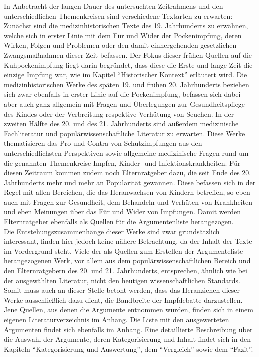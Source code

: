 \documentclass[
    a4paper,
    12pt,
    hyphens,
    chapterprefix=true,
    headheight=33pt,
    footheight=29pt,
    headings=optiontohead, %
]{scrartcl}
\begin{document}
In Anbetracht der langen Dauer des untersuchten Zeitrahmens und den unterschiedlichen Themenkreisen sind verschiedene Textarten zu erwarten: Zunächst sind die medizinhistorischen Texte des 19. Jahrhunderts zu erwähnen, welche sich in erster Linie mit dem Für und Wider der Pockenimpfung, deren Wirken, Folgen und Problemen oder den damit einhergehenden gesetzlichen Zwangsmaßnahmen dieser Zeit befassen. Der Fokus dieser frühen Quellen auf die Kuhpockenimpfung liegt darin begründet, dass diese die Erste und lange Zeit die einzige Impfung war, wie im Kapitel "`Historischer Kontext"' erläutert wird. Die medizinhistorischen Werke des späten 19. und frühen 20. Jahrhunderts beziehen sich zwar ebenfalls in erster Linie auf die Pockenimpfung, befassen sich dabei aber auch ganz allgemein mit Fragen und Überlegungen zur Gesundheitspflege des Kindes oder der Verbreitung respektive Verhütung von Seuchen. In der zweiten Hälfte des 20. und des 21. Jahrhunderts sind außerdem medizinische Fachliteratur und populärwissenschaftliche Literatur zu erwarten. Diese Werke thematisieren das Pro und Contra von Schutzimpfungen aus den unterschiedlichsten Perspektiven sowie allgemeine medizinische Fragen rund um die genannten Themenkreise Impfen, Kinder- und Infektionskrankheiten. Für diesen Zeitraum kommen zudem noch Elternratgeber dazu, die seit Ende des 20. Jahrhunderts mehr und mehr an Popularität gewannen. Diese befassen sich in der Regel mit allen Bereichen, die das Heranwachsen von Kindern betreffen, so eben auch mit Fragen zur Gesundheit, dem Behandeln und Verhüten von Krankheiten und eben Meinungen über das Für und Wider von Impfungen. Damit werden Elternratgeber ebenfalls als Quellen für die Argumentenliste herangezogen.\\
Die Entstehungszusammenhänge dieser Werke sind zwar grundsätzlich interessant, finden hier jedoch keine nähere Betrachtung, da der Inhalt der Texte im Vordergrund steht. Viele der als Quellen zum Erstellen der Argumenteliste herangezogenen Werk, vor allem aus dem populärwissenschaftlichen Bereich und den Elternratgebern des 20. und 21. Jahrhunderts, entsprechen, ähnlich wie bei der ausgewählten Literatur, nicht den heutigen wissenschaftlichen Standards. Somit muss auch an dieser Stelle betont werden, dass das Heranziehen dieser Werke ausschließlich dazu dient, die Bandbreite der Impfdebatte darzustellen.\\
Jene Quellen, aus denen die Argumente entnommen wurden, finden sich in einem eigenen Literaturverzeichnis im Anhang. Die Liste mit den ausgewerteten Argumenten findet sich ebenfalls im Anhang. Eine detaillierte Beschreibung über die Auswahl der Argumente, deren Kategorisierung und Inhalt findet sich in den Kapiteln "`Kategorisierung und Auswertung"', dem "`Vergleich"' sowie dem "`Fazit"'. 
\end{document}
